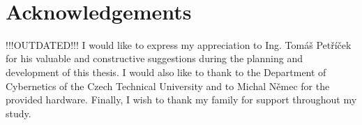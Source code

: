 ~\vfill{}

\section*{Acknowledgements}

!!!OUTDATED!!! I would like to express my appreciation to Ing. Tomáš Petříček for his valuable and constructive suggestions during the planning and development of this thesis. I would also like to thank to the Department of Cybernetics of the Czech Technical University and to Michal Němec for the provided hardware. Finally, I wish to thank my family for support throughout my study.

\vspace{2.5cm}

\newpage{}
